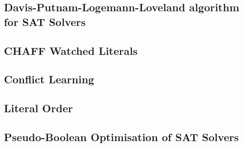 \subsection{Davis-Putnam-Logemann-Loveland algorithm for SAT Solvers}


\subsection{CHAFF Watched Literals}

\subsection{Conflict Learning}



\subsection{Literal Order}


\subsection{Pseudo-Boolean Optimisation of SAT Solvers}


